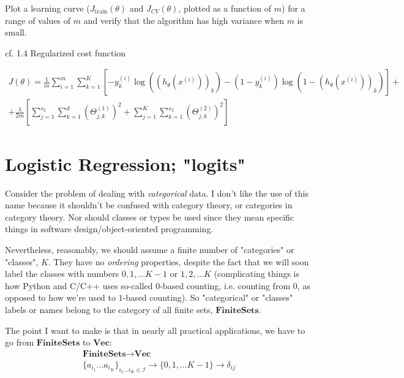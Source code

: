 \documentclass[10pt]{amsart}
\begin{document}
\begin{multicols*}{2}
Plot a learning curve ($J_{\text{train}}(\theta)$ and $J_{CV}(\theta)$, plotted as a function of $m$) for a range of values of $m$ and verify that the algorithm has high variance when $m$ is small.  




cf. 1.4 Regularized cost function

\[
\begin{gathered}
  J(\theta) = \frac{1}{m} \sum_{i=1}^m \sum_{k=1}^K \left[ -y_k^{(i)} \log{ ((h_{\theta}(x^{(i)} ) )_k ) } - (1-y_k^{(i)} ) \log{ (1- (h_{\theta}(x^{(i)} ) )_k ) } \right] + \\
+ \frac{\lambda}{2m} \left[ \sum_{j=1}^{s_2} \sum_{ k=1}^{ d} (\Theta_{j,k}^{(1)} )^2 + \sum_{j=1}^{K} \sum_{k=1}^{s_2} (\Theta^{(2)}_{j,k} )^2 \right]
  \end{gathered}
\]

\section{Logistic Regression; "logits"}  

Consider the problem of dealing with \emph{categorical} data.  I don't like the use of this name because it shouldn't be confused with category theory, or categories in category theory.  Nor should classes or types be used since they mean specific things in software design/object-oriented programming.  

Nevertheless, reasonably, we should assume a finite number of "categories" or "classes", $K$.  They have no \emph{ordering} properties, despite the fact that we will soon label the classes with numbers $0,1,\dots K-1$ or $1,2,\dots K$ (complicating things is how Python and C/C++ uses so-called $0$-based counting, i.e. counting from $0$, as opposed to how we're used to $1$-based counting).  So "categorical" or "classes" labels or names belong to the category of all finite sets, $\textbf{FiniteSets}$.  

The point I want to make is that in nearly all practical applications, we have to go from $\textbf{FiniteSets}$ to $\textbf{Vec}$: 
\begin{equation}
\begin{gathered}
\textbf{FiniteSets} \to \textbf{Vec}   \\
	\lbrace a_{i_1} \dots a_{i_K} \rbrace_{i_1\dots i_K \in \mathcal{I} } \to \lbrace 0,1,\dots K-1 \rbrace \to \delta_{ij}
\end{gathered}
\end{equation}


\end{multicols*}
\end{document}

